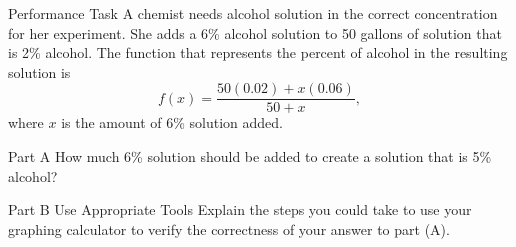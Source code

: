 \documentclass{article}
\newenvironment{practice}[2]{}{}        %
\newcommand{\answer}[1]{}               %
\newcommand{\placeholder}[2]{}          %
\begin{document}
\begin{practice}{33}{3}
Performance Task A chemist needs alcohol solution in the correct concentration for her experiment. She adds a 6\% alcohol solution to 50 gallons of solution that is 2\% alcohol. The function that represents the percent of alcohol in the resulting solution is
\[
f(x)=\frac{50(0.02)+x(0.06)}{50+x},
\]
where $x$ is the amount of 6\% solution added.

\placeholder{illustration}{Chemist pouring liquid into a container; labels ``x gallons of 6\% alcohol'' and ``50 gallons of 2\% alcohol.''}

Part A How much 6\% solution should be added to create a solution that is 5\% alcohol?

Part B Use Appropriate Tools Explain the steps you could take to use your graphing calculator to verify the correctness of your answer to part (A).

\answer{Part A 150 gallons. Part B Using the graphing function of your calculator, enter $2.5+0.05x$ for $y_1$, and $1+0.06x$ for $y_2$. Then use the TABLE function to find the $y$-values of the functions that are equivalent when $x=150$.}
\end{practice}
\end{document}

